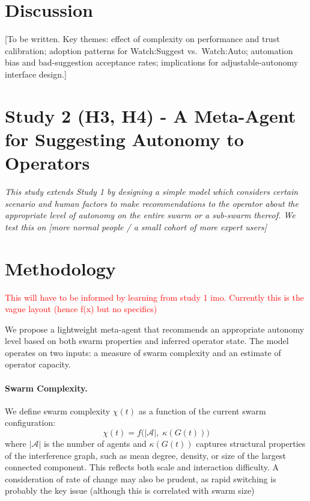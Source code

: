 \documentclass[10pt]{article}
\theoremstyle{definition}
\begin{document}
\section{Discussion}\label{sec:discussion}

[To be written. Key themes: effect of complexity on performance and trust calibration; adoption patterns for Watch:Suggest vs.\ Watch:Auto; automation bias and bad-suggestion acceptance rates; implications for adjustable-autonomy interface design.]


\section*{Study 2 (H3, H4) - A Meta-Agent for Suggesting Autonomy to Operators}
\begin{center}
    \textit{This study extends Study 1 by designing a simple model which considers certain scenario and human factors to make recommendations to the operator about the appropriate level of autonomy on the entire swarm or a sub-swarm thereof. We test this on [more normal people / a small cohort of more expert users]}
\end{center}

\section{Methodology}
\textcolor{red}{This will have to be informed by learning from study 1 imo. Currently this is the vague layout (hence f(x) but no specifics)}

We propose a lightweight meta-agent that recommends an appropriate autonomy level based on both swarm properties and inferred operator state. The model operates on two inputs: a measure of swarm complexity and an estimate of operator capacity.

\paragraph{Swarm Complexity.}
We define swarm complexity $\chi(t)$ as a function of the current swarm configuration:
\[
\chi(t) = f\bigl(|\mathcal{A}|,\; \kappa(G(t))\bigr)
\]
where $|\mathcal{A}|$ is the number of agents and $\kappa(G(t))$ captures structural properties of the interference graph, such as mean degree, density, or size of the largest connected component. This reflects both scale and interaction difficulty. A consideration of rate of change may also be prudent, as rapid switching is probably the key issue (although this is correlated with swarm size)
\end{document}
